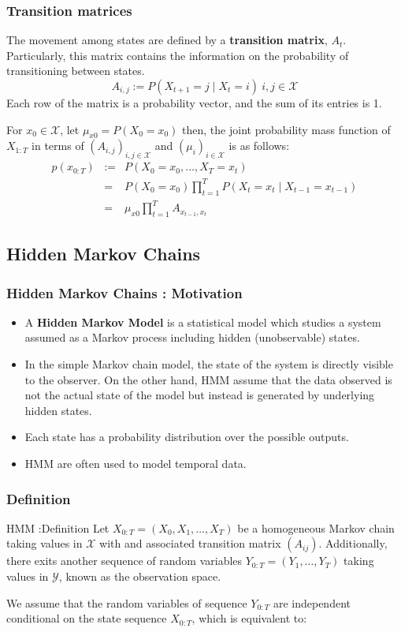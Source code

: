\documentclass[xcolor=dvipsnames, compress]{beamer}
\begin{document}
\begin{frame}
\frametitle{Transition matrices}
The movement among states are defined by a \textbf{transition matrix}, $A_{t}$. Particularly, this matrix contains the information on the probability of transitioning between states. 
\begin{equation*}
A_{i,j}:={P}\left(X_{t+1}=j\mid X_{t}=i\right)\:i,j\in\mathcal{X}
\end{equation*}		
Each row of the matrix is a probability vector, and the sum of its entries is 1. 

For $x_{0}\in\mathcal{X}$, let $\mu_{x0}={P}\left(X_{0}=x_{0}\right)$ then, the joint probability mass function of $X_{1:T}$ in terms of $\left(A_{i,j}\right)_{i,j\in\mathcal{X}}$ and $\left(\mu_{i}\right)_{i\in\mathcal{X}}$ is as follows:
\begin{eqnarray*}
p\left(x_{0:T}\right) & := & {P}\left(X_{0}=x_{0},\ldots,X_{T}=x_{t}\right)\\
& =& {P}\left(X_{0}=x_{0}\right)\prod_{t=1}^{T}{P}\left(X_{t}=x_{t}\mid X_{t-1}=x_{t-1}\right)\\
& = & \mu_{x0}\prod_{t=1}^{T}A_{x_{t-1},x_{t}}
\end{eqnarray*}		
\end{frame}
%
\begin{frame}
\section{Hidden Markov Chains }
\frametitle{Hidden Markov Chains : Motivation}
\begin{itemize}
\item A  \textbf{Hidden Markov Model} is a statistical model which studies a system assumed as a Markov process including hidden (unobservable) states. 
\item In the simple Markov chain model, the state of the system is directly visible to the observer. On the other hand, HMM assume that the data observed is not the actual state of the model but instead is generated by underlying hidden states.
\item Each state has a probability distribution over the possible outputs. 
\item HMM are often used to model temporal data.
\end{itemize}
\end{frame}
%
\begin{frame}
\frametitle{Definition}
\begin{block}{HMM :Definition}
Let $X_{0:T}=\left(X_{0},X_{1},\ldots,X_{T}\right)$ be a homogeneous Markov chain taking values in $\mathcal{X}$ with and associated transition matrix $\left(A_{ij}\right)$. Additionally, there exits another sequence of random variables $Y_{0:T}=\left(Y_{1},\ldots,Y_{T}\right)$ taking values in $\mathcal{Y}$, known as the observation space. 
\end{block}	

We assume that the random variables of sequence $Y_{0:T}$ are independent conditional on the state sequence $X_{0:T}$, which is equivalent to:
\end{frame}
\end{document}
